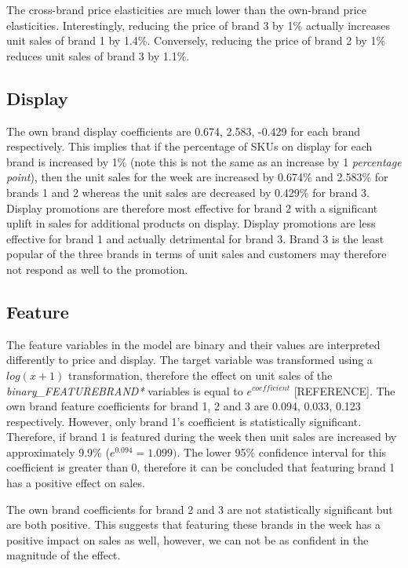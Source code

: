 \documentclass[a4paper,11pt]{article}
\begin{document}
The cross-brand price elasticities are much lower than the own-brand price elasticities. Interestingly, reducing the price of brand 3 by 1\% actually increases unit sales of brand 1 by 1.4\%. Conversely, reducing the price of brand 2 by 1\% reduces unit sales of brand 3 by 1.1\%. 


\subsection{Display}

The own brand display coefficients are 0.674, 2.583, -0.429 for each brand respectively. This implies that if the percentage of SKUs on display for each brand is increased by 1\% (note this is not the same as an increase by 1 \textit{percentage point}), then the unit sales for the week are increased by 0.674\% and 2.583\% for brands 1 and 2 whereas the unit sales are decreased by 0.429\% for brand 3. Display promotions are therefore most effective for brand 2 with a significant uplift in sales for additional products on display. Display promotions are less effective for brand 1 and actually detrimental for brand 3. Brand 3 is the least popular of the three brands in terms of unit sales and customers may therefore not respond as well to the promotion.

\subsection{Feature}

The feature variables in the model are binary and their values are interpreted differently to price and display. The target variable was transformed using a $log(x+1)$ transformation, therefore the effect on unit sales of the \textit{binary\_FEATUREBRAND*} variables is equal to $e^{coefficient}$ [REFERENCE]. The own brand feature coefficients for brand 1, 2 and 3 are 0.094, 0.033, 0.123 respectively. However, only brand 1's coefficient is statistically significant. Therefore, if brand 1 is featured during the week then unit sales are increased by approximately 9.9\% ($e^0.094 = 1.099)$. The lower 95\% confidence interval for this coefficient is greater than 0, therefore it can be concluded that featuring brand 1 has a positive effect on sales.

The own brand coefficients for brand 2 and 3 are not statistically significant but are both positive. This suggests that featuring these brands in the week has a positive impact on sales as well, however, we can not be as confident in the magnitude of the effect.
\end{document}
